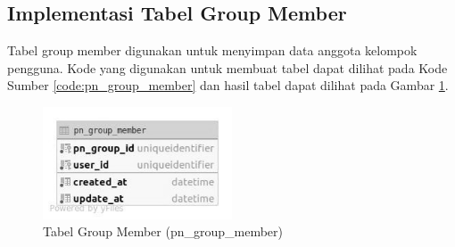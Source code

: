 \subsection{Implementasi Tabel Group Member}
\par Tabel group member digunakan untuk menyimpan data anggota kelompok pengguna. Kode yang digunakan untuk membuat tabel dapat dilihat pada Kode Sumber \ref{code:pn_group_member} dan hasil tabel dapat dilihat pada Gambar \ref{tabel_pn_group_member}.

\begin{figure}[H]
    \centering\includegraphics[width=0.5\textwidth]{bab4/figures/tabel_pn_group_member.jpg}
    \caption{Tabel Group Member (pn\_group\_member)}
    \label{tabel_pn_group_member}
\end{figure}

%

